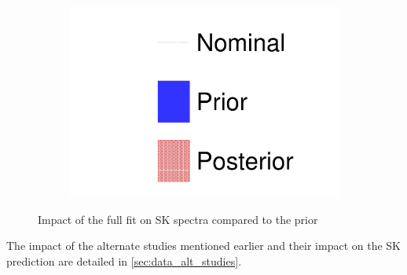 \begin{figure}[h]
\begin{subfigure}[t]{0.32\textwidth}
		\includegraphics[width=\textwidth, trim={0mm 0mm 0mm 0mm}, clip, page=4]{figures/mach3/data/prior_error_1june_try_2017_fit_on_sk_spectra}
	\end{subfigure}
	
	\caption{Impact of the full fit on SK spectra compared to the prior}
	\label{fig:sk_2017}
\end{figure}

The impact of the alternate studies mentioned earlier and their impact on the SK prediction are detailed in \autoref{sec:data_alt_studies}.